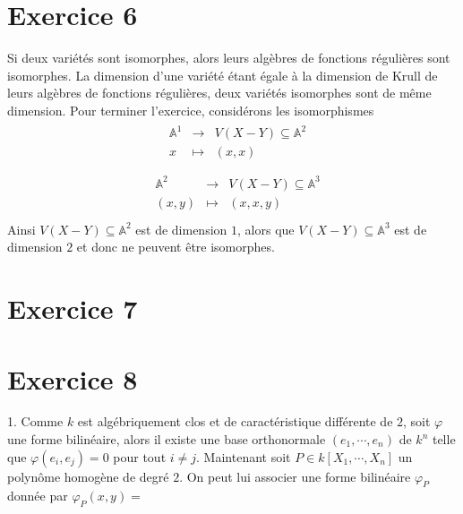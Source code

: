     \section{Exercice 6}
        Si deux variétés sont isomorphes, alors leurs algèbres de fonctions régulières sont isomorphes. La dimension d'une variété étant égale à la dimension de Krull de leurs algèbres de fonctions régulières, deux variétés isomorphes sont de même dimension. Pour terminer l'exercice, considérons les isomorphismes
        \begin{align*}
            \begin{array}{cccc}
                & \mathbb{A}^1 & \to & V(X - Y) \subseteq \mathbb{A}^2 \\
                & x & \mapsto & (x, x) \\
            \end{array}
        \end{align*}
        \begin{align*}
            \begin{array}{cccc}
                & \mathbb{A}^2 & \to & V(X - Y) \subseteq \mathbb{A}^3 \\
                & (x,y) & \mapsto & (x, x, y) \\
            \end{array}
        \end{align*}
        Ainsi $V(X - Y) \subseteq \mathbb{A}^2$ est de dimension $1$, alors que $V(X - Y) \subseteq \mathbb{A}^3$ est de dimension $2$ et donc ne peuvent être isomorphes.

    \section{Exercice 7}

    \section{Exercice 8}
        \begin{question}{1.}
            Comme $k$ est algébriquement clos et de caractéristique différente de $2$, soit $\varphi$ une forme bilinéaire, alors il existe une base orthonormale $(e_1, \cdots, e_n)$ de $k^n$ telle que $\varphi(e_i, e_j) = 0$ pour tout $i \neq j$. Maintenant soit $P \in k[X_1, \cdots, X_n]$ un polynôme homogène de degré $2$. On peut lui associer une forme bilinéaire $\varphi_P$ donnée par $\varphi_P(x,y) = $
        \end{question} 

